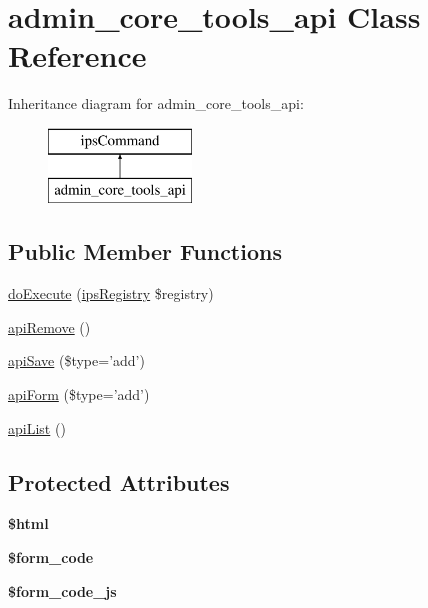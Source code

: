 \hypertarget{classadmin__core__tools__api}{\section{admin\-\_\-core\-\_\-tools\-\_\-api Class Reference}
\label{classadmin__core__tools__api}
}
Inheritance diagram for admin\-\_\-core\-\_\-tools\-\_\-api\-:\begin{figure}[H]
\begin{center}
\leavevmode
\includegraphics[height=2.000000cm]{classadmin__core__tools__api}
\end{center}
\end{figure}
\subsection*{Public Member Functions}
\begin{DoxyCompactItemize}
\item 
\hyperlink{classadmin__core__tools__api_afbc4e912a0604b94d47d66744c64d8ba}{do\-Execute} (\hyperlink{classips_registry}{ips\-Registry} \$registry)
\item 
\hyperlink{classadmin__core__tools__api_a01a3819a9351980cd286652ea862092e}{api\-Remove} ()
\item 
\hyperlink{classadmin__core__tools__api_aa3e005920503ba9d2f639cfbd48253eb}{api\-Save} (\$type='add')
\item 
\hyperlink{classadmin__core__tools__api_ac2f76c424a2638ec40f048061bd72d14}{api\-Form} (\$type='add')
\item 
\hyperlink{classadmin__core__tools__api_a4a8adacc475b336b3c2c8c5ddddb8b3b}{api\-List} ()
\end{DoxyCompactItemize}
\subsection*{Protected Attributes}
\begin{DoxyCompactItemize}
\item 
\hypertarget{classadmin__core__tools__api_a6f96e7fc92441776c9d1cd3386663b40}{{\bfseries \$html}}\label{classadmin__core__tools__api_a6f96e7fc92441776c9d1cd3386663b40}

\item 
\hypertarget{classadmin__core__tools__api_af28aee726fa3eb6c355d08a2ab655e03}{{\bfseries \$form\-\_\-code}}\label{classadmin__core__tools__api_af28aee726fa3eb6c355d08a2ab655e03}

\item 
\hypertarget{classadmin__core__tools__api_ac68fe8a02a2efd63c3271179f4b4fbb7}{{\bfseries \$form\-\_\-code\-\_\-js}}\label{classadmin__core__tools__api_ac68fe8a02a2efd63c3271179f4b4fbb7}

\end{DoxyCompactItemize}
